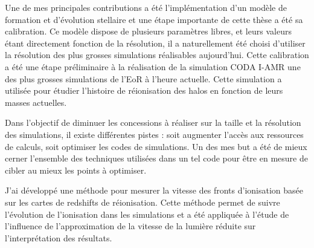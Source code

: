 Une de mes principales contributions a été l'implémentation d'un modèle de formation et d'évolution stellaire et une étape importante de cette thèse a été sa calibration.
Ce modèle dispose de plusieurs paramètres libres, et leurs valeurs étant directement fonction de la résolution, il a naturellement été choisi d'utiliser la résolution des plus grosses simulations réalisables aujourd'hui.
Cette calibration a été une étape préliminaire à la réalisation de la simulation CODA I-AMR une des plus grosses simulations de l'\ac{EoR} à l'heure actuelle.
Cette simulation a utilisée pour étudier l'histoire de réionisation des halos en fonction de leurs masses actuelles.


Dans l'objectif de diminuer les concessions à réaliser sur la taille et la résolution des simulations, il existe différentes pistes : soit augmenter l'accès aux ressources de calculs, soit optimiser les codes de simulations.
Un des mes but a été de mieux cerner l'ensemble des techniques utilisées dans un tel code pour être en mesure de cibler au mieux les points à optimiser.

J'ai développé une méthode pour mesurer la vitesse des fronts d'ionisation basée sur les cartes de redshifts de réionisation.
Cette méthode permet de suivre l'évolution de l'ionisation dans les simulations et a été appliquée à l'étude de l'influence de l'approximation de la vitesse de la lumière réduite sur l'interprétation des résultats.

